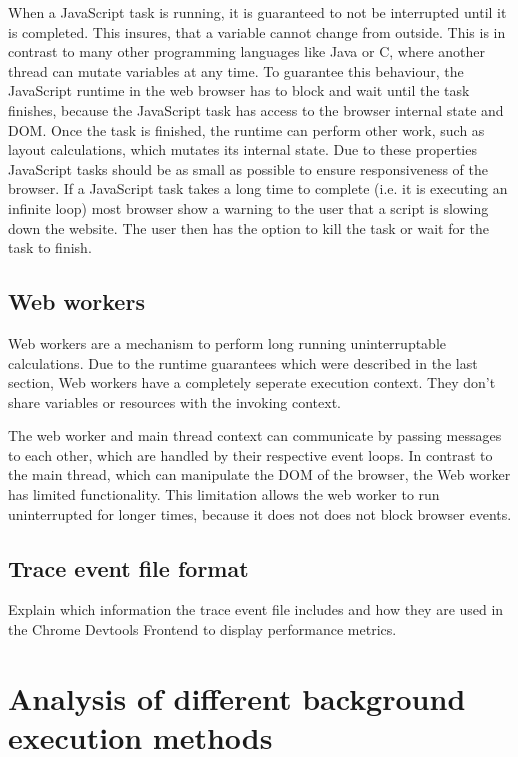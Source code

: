 \documentclass[article,type=bsc,colorback,accentcolor=tud9c]{tudthesis}
\begin{document}
  When a JavaScript task is running, it is guaranteed to not be interrupted until it is completed. This insures, that a variable cannot change from outside. This is in contrast to many other programming languages like Java or C, where another thread can mutate variables at any time. To guarantee this behaviour, the JavaScript runtime in the web browser has to block and wait until the task finishes, because the JavaScript task has access to the browser internal state and DOM. Once the task is finished, the runtime can perform other work, such as layout calculations, which mutates its internal state. Due to these properties JavaScript tasks should be as small as possible to ensure responsiveness of the browser. If a JavaScript task takes a long time to complete (i.e. it is executing an infinite loop) most browser show a warning to the user that a script is slowing down the website. The user then has the option to kill the task or wait for the task to finish.
  
  
  \subsection{Web workers}

  Web workers are a mechanism to perform long running uninterruptable calculations. Due to the runtime guarantees which were described in the last section, Web workers have a completely seperate execution context. They don't share variables or resources with the invoking context.

  The web worker and main thread context can communicate by passing messages to each other, which are handled by their respective event loops. In contrast to the main thread, which can manipulate the DOM of the browser, the Web worker has limited functionality. This limitation allows the web worker to run uninterrupted for longer times, because it does not does not block browser events.


  \subsection{Trace event file format}

  Explain which information the trace event file includes and how they are used in the Chrome Devtools Frontend to display performance metrics.
  
  \newpage
  \section{Analysis of different background execution methods}
\end{document}
